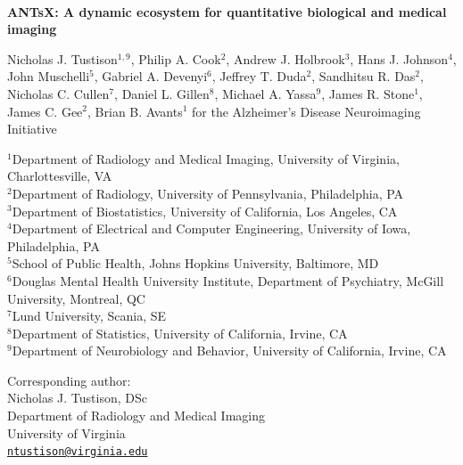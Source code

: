 \documentclass[12pt,]{article}
\author{}
\date{\vspace{-2.5em}}
\begin{document}


\begin{centering}

$ $

\vspace{4.cm}

\LARGE

{\bf ANTsX:  A dynamic ecosystem for quantitative biological and medical imaging}

\vspace{0.5 cm}

\normalsize

Nicholas J. Tustison$^{1,9}$,
Philip A. Cook$^{2}$,
Andrew J. Holbrook$^{3}$,
Hans J. Johnson$^{4}$,
John Muschelli$^{5}$,
Gabriel A. Devenyi$^{6}$,
Jeffrey T. Duda$^{2}$,
Sandhitsu R. Das$^{2}$,
Nicholas C. Cullen$^{7}$,
Daniel L. Gillen$^{8}$,
Michael A. Yassa$^{9}$,
James R. Stone$^{1}$,
James C. Gee$^{2}$,
Brian B. Avants$^{1}$
for the Alzheimer’s Disease Neuroimaging Initiative

\footnotesize

$^{1}$Department of Radiology and Medical Imaging, University of Virginia, Charlottesville, VA \\
$^{2}$Department of Radiology, University of Pennsylvania, Philadelphia, PA \\
$^{3}$Department of Biostatistics, University of California, Los Angeles, CA \\
$^{4}$Department of Electrical and Computer Engineering, University of Iowa, Philadelphia, PA \\
$^{5}$School of Public Health, Johns Hopkins University, Baltimore, MD \\
$^{6}$Douglas Mental Health University Institute, Department of Psychiatry, McGill University, Montreal, QC \\
$^{7}$Lund University, Scania, SE \\
$^{8}$Department of Statistics, University of California, Irvine, CA \\
$^{9}$Department of Neurobiology and Behavior, University of California, Irvine, CA \\

\end{centering}

\vspace{4.5 cm}

\scriptsize

Corresponding author:\\
Nicholas J. Tustison, DSc\\
Department of Radiology and Medical Imaging\\
University of Virginia\\
\href{mailto:ntustison@virginia.edu}{\nolinkurl{ntustison@virginia.edu}}
\end{document}
